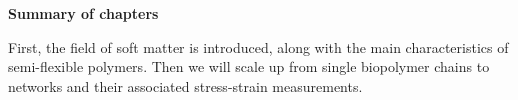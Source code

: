 \documentclass[11pt, a4paper, oneside]{Thesis} %
\begin{document}
% 
%  
% 
% 
% 
% 
% 
% 
% 
 {\huge{\textbf{Summary of chapters}} \par}
 
First, the field of soft matter is introduced, along with the main
characteristics of semi-flexible polymers.  Then we will scale up
from single biopolymer chains to networks and their associated stress-strain
measurements.
\end{document}
